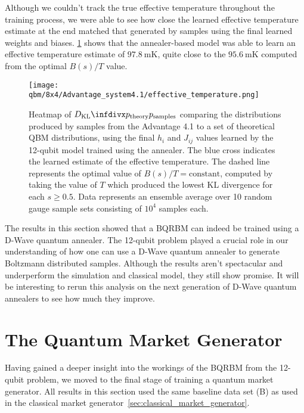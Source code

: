 Although we couldn't track the true effective temperature throughout the training process, we were able to see how close the learned effective temperature estimate at the end matched that generated by samples using the final learned weights and biases.
\cref{fig:learned_effective_temperature} shows that the annealer-based model was able to learn an effective temperature estimate of \( 97.8 \ \si{\milli\kelvin} \), quite close to the \( 95.6 \ \si{\milli\kelvin} \) computed from the optimal \( B(s) / T \) value.
\begin{figure}[!htb]
    \begin{center}
        \texttt{[image: qbm/8x4/Advantage\_system4.1/effective\_temperature.png]}
    \end{center}
    \caption{
        Heatmap of \( \DKL{\ptheory}{\psamples} \) comparing the distributions produced by samples from the Advantage 4.1 to a set of theoretical QBM distributions, using the final \( h_i \) and \( J_{ij} \) values learned by the 12-qubit model trained using the annealer.
        The blue cross indicates the learned estimate of the effective temperature.
        The dashed line represents the optimal value of \( B(s) / T = \text{constant} \), computed by taking the value of \( T \) which produced the lowest KL divergence for each \( s \ge 0.5 \).
        Data represents an ensemble average over 10 random gauge sample sets consisting of \( 10^4 \) samples each.
    }
    \label{fig:learned_effective_temperature}
\end{figure}

The results in this section showed that a BQRBM can indeed be trained using a D-Wave quantum annealer.
The 12-qubit problem played a crucial role in our understanding of how one can use a D-Wave quantum annealer to generate Boltzmann distributed samples.
Although the results aren't spectacular and underperform the simulation and classical model, they still show promise.
It will be interesting to rerun this analysis on the next generation of D-Wave quantum annealers to see how much they improve.

\section{The Quantum Market Generator}\label{sec:quantum_market_generator}
Having gained a deeper insight into the workings of the BQRBM from the 12-qubit problem, we moved to the final stage of training a quantum market generator.
All results in this section used the same baseline data set (B) as used in the classical market generator~\cref{sec:classical_market_generator}.

